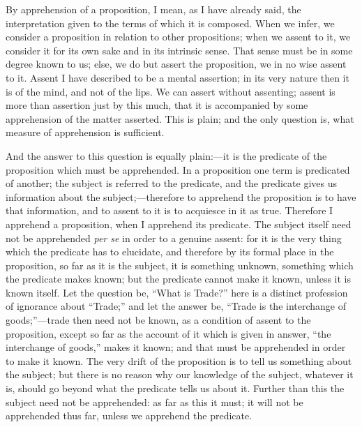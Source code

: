 By apprehension of a proposition, I mean, as I have already said,
the interpretation given to the terms of which it is composed. When we
infer, we consider a proposition in relation to other propositions;
when we assent to it, we consider it for its own sake and in its
intrinsic sense. That sense must be in some degree known to us; else,
we do but assert the proposition, we in no wise assent to it. Assent I
have described to be a mental assertion; in its very nature then it is
of the mind, and not of the lips. We can assert without assenting;
assent is more than assertion just by this much, that it is
accompanied by some apprehension of the matter asserted. This is
plain; and the only question is, what measure of apprehension is
sufficient.

And the answer to this question is equally plain:—it is the
predicate of the proposition which must be apprehended. In a
proposition one term is predicated of another; the subject is referred
to the predicate, and the predicate gives us information about the
subject;—therefore to apprehend the proposition is to have that
information, and to assent to it is to acquiesce in it as true.
Therefore I apprehend a proposition, when I apprehend its predicate.
The subject itself need not be apprehended \emph{per se} in order to a
genuine assent: for it is the very thing which the predicate has to
elucidate, and therefore by its formal place in the proposition, so
far as it is the subject, it is something unknown, something which the
predicate makes known; but the predicate cannot make it known, unless
it is known itself. Let the question be, ``What is Trade?''
here is a distinct profession of ignorance about ``Trade;''
and let the answer be, ``Trade is the interchange of goods;''—trade
then need not be known, as a condition of assent to the proposition,
except so far as the account of it which is given in answer, ``the
interchange of goods,'' makes it known; and that must be
apprehended in order to make it known. The very drift of the
proposition is to tell us something about the subject; but there is no
reason why our knowledge of the subject, whatever it is, should go
beyond what the predicate tells us about it. Further than this the
subject need not be apprehended: as far as this it must; it will not
be apprehended thus far, unless we apprehend the predicate.

